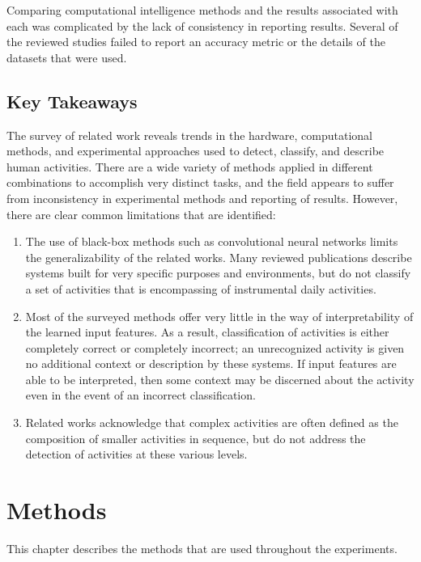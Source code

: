 \documentclass[12pt]{report}
\begin{document}
Comparing computational intelligence methods and the results associated with each was complicated by the lack of consistency in reporting results. Several of the reviewed studies failed to report an accuracy metric or the details of the datasets that were used.

\section{Key Takeaways}
The survey of related work reveals trends in the hardware, computational methods, and experimental approaches used to detect, classify, and describe human activities. There are a wide variety of methods applied in different combinations to accomplish very distinct tasks, and the field appears to suffer from inconsistency in experimental methods and reporting of results. However, there are clear common limitations that are identified:
\begin{enumerate}
    \item The use of black-box methods such as convolutional neural networks limits the generalizability of the related works. Many reviewed publications describe systems built for very specific purposes and environments, but do not classify a set of activities that is encompassing of instrumental daily activities.
    \item Most of the surveyed methods offer very little in the way of interpretability of the learned input features. As a result, classification of activities is either completely correct or completely incorrect; an unrecognized activity is given no additional context or description by these systems. If input features are able to be interpreted, then some context may be discerned about the activity even in the event of an incorrect classification.
    \item Related works acknowledge that complex activities are often defined as the composition of smaller activities in sequence, but do not address the detection of activities at these various levels.
\end{enumerate}

\chapter{Methods}

This chapter describes the methods that are used throughout the experiments.
\end{document}
